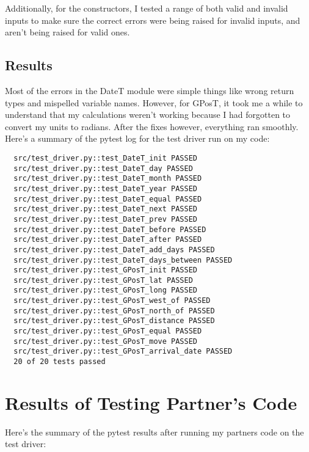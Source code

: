 \documentclass[12pt]{article}
\begin{document}
Additionally, for the constructors, I tested a range of both valid and invalid inputs to make sure the correct errors were being raised for invalid inputs, and aren't being raised for valid ones.

\subsection{Results}
Most of the errors in the DateT module were simple things like wrong return types and mispelled variable names. However, for GPosT, it took me a while to understand that my calculations weren't working because I had forgotten to convert my units to radians. After the fixes however, everything ran smoothly. Here's a summary of the pytest log for the test driver run on my code:

\begin{lstlisting}
  src/test_driver.py::test_DateT_init PASSED
  src/test_driver.py::test_DateT_day PASSED
  src/test_driver.py::test_DateT_month PASSED
  src/test_driver.py::test_DateT_year PASSED
  src/test_driver.py::test_DateT_equal PASSED
  src/test_driver.py::test_DateT_next PASSED
  src/test_driver.py::test_DateT_prev PASSED
  src/test_driver.py::test_DateT_before PASSED
  src/test_driver.py::test_DateT_after PASSED
  src/test_driver.py::test_DateT_add_days PASSED
  src/test_driver.py::test_DateT_days_between PASSED
  src/test_driver.py::test_GPosT_init PASSED
  src/test_driver.py::test_GPosT_lat PASSED
  src/test_driver.py::test_GPosT_long PASSED
  src/test_driver.py::test_GPosT_west_of PASSED
  src/test_driver.py::test_GPosT_north_of PASSED
  src/test_driver.py::test_GPosT_distance PASSED
  src/test_driver.py::test_GPosT_equal PASSED
  src/test_driver.py::test_GPosT_move PASSED
  src/test_driver.py::test_GPosT_arrival_date PASSED
  20 of 20 tests passed
\end{lstlisting}

\section{Results of Testing Partner's Code}

Here's the summary of the pytest results after running my partners code on the test driver:
\end{document}
